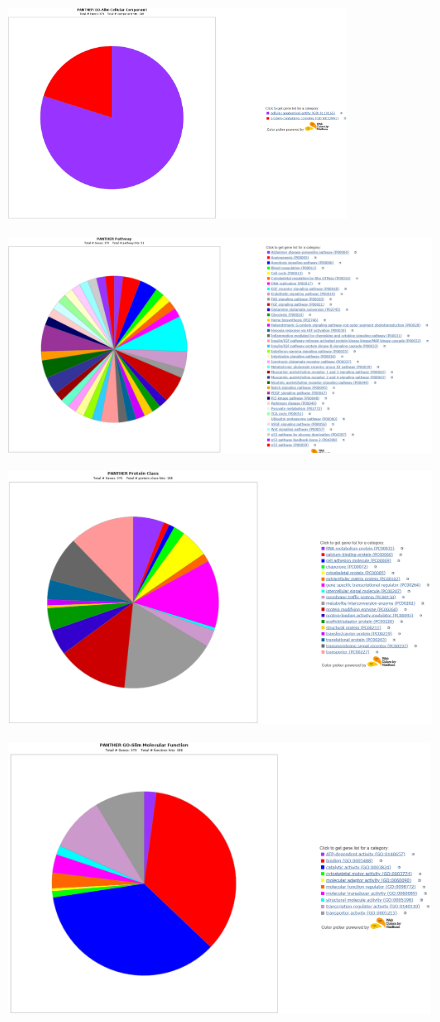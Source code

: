 \documentclass[UTF8]{ctexart}
\begin{document}
\begin{figure}[h]
	\centering
	\includegraphics[width=0.8\textwidth]{img/GO_CelCom.png}
\end{figure}

\begin{figure}[h]
	\centering
	\includegraphics[width=\textwidth]{img/GO_Path.png}
\end{figure}

\begin{figure}[h]
	\centering
	\includegraphics[width=\textwidth]{img/GO_ProCla.png}
\end{figure}

\begin{figure}[h]
	\centering
	\includegraphics[width=\textwidth]{img/GO_MolFun.png}
\end{figure}
\end{document}
